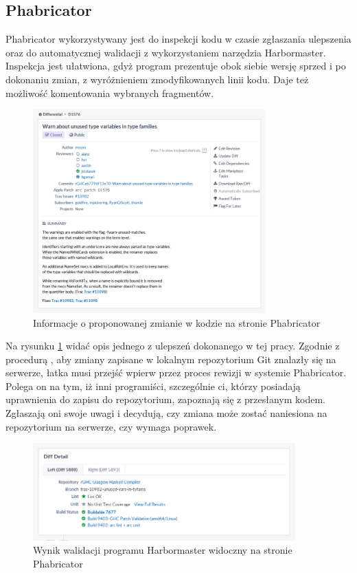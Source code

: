 \subsection{Phabricator}

\cite{WikiPhabricator}

Phabricator wykorzystywany jest do inspekcji kodu w czasie zgłaszania ulepszenia oraz do automatycznej walidacji z wykorzystaniem narzędzia Harbormaster. Inspekcja jest ułatwiona, gdyż program prezentuje obok siebie wersję sprzed i po dokonaniu zmian, z wyróżnieniem zmodyfikowanych linii kodu. Daje też możliwość komentowania wybranych fragmentów.

\begin{figure}[ht]
    \centering
    \includegraphics[width=0.8\textwidth]{images/Phabricator_summary}
    \caption{Informacje o proponowanej zmianie w kodzie na stronie Phabricator}
    \label{fig:Phabricator_summary}
\end{figure}

Na rysunku \ref{fig:Phabricator_summary} widać opis jednego z ulepszeń dokonanego w tej pracy. Zgodnie z procedurą \cite{WikiFixingBugs}, aby zmiany zapisane w lokalnym repozytorium Git znalazły się na serwerze, łatka musi przejść wpierw przez proces rewizji w systemie Phabricator. Polega on na tym, iż inni programiści, szczególnie ci, którzy posiadają uprawnienia do zapisu do repozytorium, zapoznają się z przesłanym kodem. Zgłaszają oni swoje uwagi i decydują, czy zmiana może zostać naniesiona na repozytorium na serwerze, czy wymaga poprawek.

\begin{figure}[ht]
    \centering
    \includegraphics[width=0.9\textwidth]{images/Phabricator_validate}
    \caption{Wynik walidacji programu Harbormaster widoczny na stronie Phabricator}
    \label{fig:Phabricator_validate}
\end{figure}

